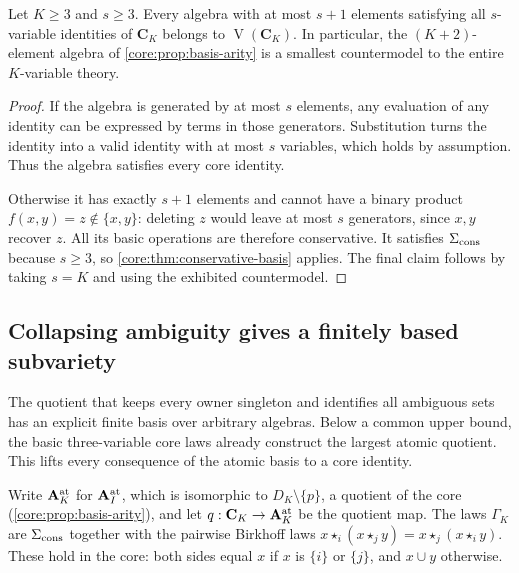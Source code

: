 \begin{corollary}\label{core:cor:small-countermodel}
Let $K\geq3$ and $s\geq3$. Every algebra with at most $s+1$
elements satisfying all $s$-variable identities of $\mathbf C_K$
belongs to $\operatorname V(\mathbf C_K)$. In particular, the
$(K+2)$-element algebra of \cref{core:prop:basis-arity} is a smallest
countermodel to the entire $K$-variable theory.
\end{corollary}
\begin{proof}
If the algebra is generated by at most $s$ elements, any evaluation
of any identity can be expressed by terms in those generators.
Substitution turns the identity into a valid identity with at most
$s$ variables, which holds by assumption. Thus the algebra satisfies
every core identity.

Otherwise it has exactly $s+1$ elements and cannot have a binary
product $f(x,y)=z\notin\{x,y\}$: deleting $z$ would leave at most
$s$ generators, since $x,y$ recover $z$. All its basic operations
are therefore conservative. It satisfies $\Sigma_{\rm cons}$ because
$s\geq3$, so \cref{core:thm:conservative-basis} applies. The final
claim follows by taking $s=K$ and using the exhibited countermodel.
\end{proof}

\subsection{Collapsing ambiguity gives a finitely based subvariety}
\label{app:core-atomic}

The quotient that keeps every owner singleton and identifies all
ambiguous sets has an explicit finite basis over arbitrary algebras.
Below a common upper bound, the basic three-variable core laws already
construct the largest atomic quotient. This lifts every consequence of
the atomic basis to a core identity.

Write $\mathbf A_K^{\rm at}$ for $\mathbf A_I^{\rm at}$, which is
isomorphic to $D_K\setminus\{p\}$, a quotient of the core
(\cref{core:prop:basis-arity}), and let
$q:\mathbf C_K\to\mathbf A_K^{\rm at}$ be the quotient map.
The laws $\Gamma_K$ are $\Sigma_{\rm cons}$ together with the pairwise
Birkhoff laws $x\star_i(x\star_j y)=x\star_j(x\star_i y)$. These hold in the
core: both sides equal $x$ if $x$ is $\{i\}$ or $\{j\}$, and $x\cup y$
otherwise.

